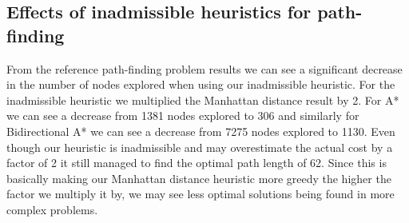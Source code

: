 \documentclass{article}
\begin{document}
\subsection{Effects of inadmissible heuristics for path-finding}
From the reference path-finding problem results we can see a significant decrease in the number of nodes explored when using our inadmissible heuristic. For the inadmissible heuristic we multiplied the Manhattan distance result by 2. For A* we can see a decrease from 1381 nodes explored to 306 and similarly for Bidirectional A* we can see a decrease from 7275 nodes explored to 1130. Even though our heuristic is inadmissible and may overestimate the actual cost by a factor of 2 it still managed to find the optimal path length of 62. Since this is basically making our Manhattan distance heuristic more greedy the higher the factor we multiply it by, we may see less optimal solutions being found in more complex problems.

 

\end{document}
